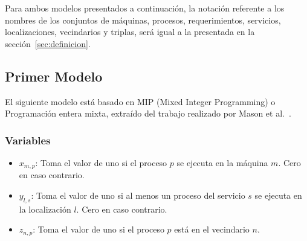 \documentclass[../informe2.tex]{subfiles}
\begin{document}
Para ambos modelos presentados a continuación, la notación referente a los nombres de los conjuntos de máquinas, procesos, requerimientos, servicios, localizaciones, vecindarios y triplas, será igual a la presentada en la sección~\ref{sec:definicion}.
\subsection{Primer Modelo}
El siguiente modelo está basado en  MIP (Mixed Integer Programming) o Programación entera mixta, extraído del trabajo realizado por Mason et al.~\cite{masson2013iterated}.

\subsubsection{Variables}
\begin{itemize}
	\item $x_{m,p}$: Toma el valor de uno si el proceso $p$ se ejecuta en la máquina $m$. Cero en caso contrario.
	\item $y_{l,s}$: Toma el valor de uno si al menos un proceso del servicio $s$ se ejecuta en la localización $l$. Cero en caso contrario.
	\item $z_{n,p}$: Toma el valor de uno si el proceso $p$ está en el vecindario $n$.
\end{itemize}
\end{document}
